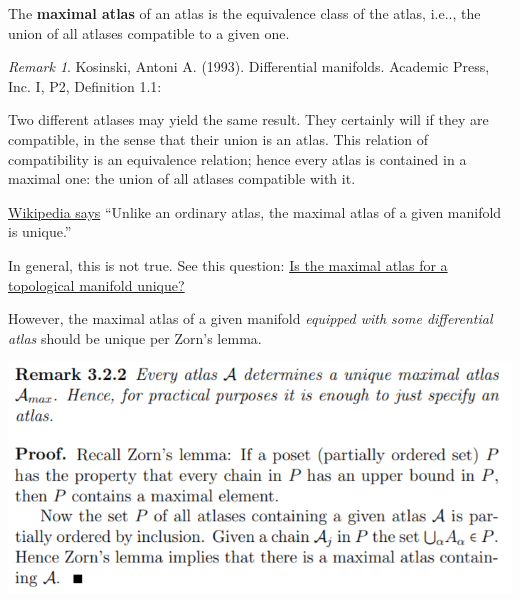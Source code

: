\documentclass[12pt, letterpaper]{article}
\makeatletter
\newcommand\ie{i.e\@ifnextchar.{}{.\@}}
\theoremstyle{definition}
\theoremstyle{remark}
\newtheorem*{rem*}{Remark}
\theoremstyle{definition}
\theoremstyle{plain}
\numberwithin{equation}{section}
\makeatother
\begin{document}
	\begin{def*}
		The \textbf{maximal atlas} of an atlas is the equivalence class of the atlas,
		\ie, the union of all atlases compatible to a given one.
	\end{def*}
	\begin{rem*}
		Kosinski, Antoni A. (1993). Differential manifolds. Academic Press, Inc. %
		I, P2, Definition 1.1:		
		
		Two different
		atlases may yield the same result. They certainly will if they are compatible,
		in the sense that their union is an atlas. This relation of compatibility is an
		equivalence relation; hence every atlas is contained in a maximal one: the
		union of all atlases compatible with it.
		
		
		\href{https://en.wikipedia.org/wiki/Manifold#Atlases}{Wikipedia says}
		``Unlike an ordinary atlas, the maximal atlas of a given manifold is unique.''
		
		In general, this is not true. See this question:
		\href{https://math.stackexchange.com/questions/2473974/is-the-maximal-atlas-for-a-topological-manifold-unique}
		{Is the maximal atlas for a topological manifold unique?}
		
		However, the maximal atlas of a given manifold \textit{equipped with some differential atlas} should be unique
		per Zorn’s lemma.
		
		\includegraphics{unique_maximal_atlas}
	\end{rem*}
\end{document}
